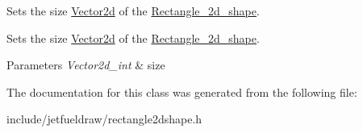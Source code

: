 Sets the size \hyperlink{classjetfuel_1_1draw_1_1Vector2d}{Vector2d} of the \hyperlink{classjetfuel_1_1draw_1_1Rectangle__2d__shape}{Rectangle\+\_\+2d\+\_\+shape}. 

Sets the size \hyperlink{classjetfuel_1_1draw_1_1Vector2d}{Vector2d} of the \hyperlink{classjetfuel_1_1draw_1_1Rectangle__2d__shape}{Rectangle\+\_\+2d\+\_\+shape}.


\begin{DoxyParams}{Parameters}
{\em Vector2d\+\_\+int} & size \\
\hline
\end{DoxyParams}


The documentation for this class was generated from the following file\+:\begin{DoxyCompactItemize}
\item 
include/jetfueldraw/rectangle2dshape.\+h\end{DoxyCompactItemize}
